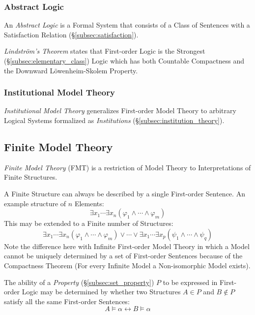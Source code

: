 \documentclass{article}
\begin{document}
\subsubsection{Abstract Logic}

An \emph{Abstract Logic} is a Formal System that consists of a Class
of Sentences with a Satisfaction Relation
(\S\ref{subsec:satisfaction}).

\emph{Lindstr\"om's Theorem} states that First-order Logic is the
Strongest (\S\ref{subsec:elementary_class}) Logic which has both
Countable Compactness and the Downward L\"owenheim-Skolem Property.

\subsubsection{Institutional Model Theory}

\emph{Institutional Model Theory} generalizes First-order Model Theory
to arbitrary Logical Systems formalized as \emph{Institutions}
(\S\ref{subsec:institution_theory}).

\subsection{Finite Model Theory}

\emph{Finite Model Theory} (FMT) is a restriction of Model Theory to
Interpretations of Finite Structures.

A Finite Structure can always be described by a single First-order
Sentence. An example structure of $n$ Elements:
\[
    \exists x_1 \cdots \exists x_n ( \varphi_1 \wedge \cdots \wedge
    \varphi_m )
\]
This may be extended to a Finite number of Structures:
\[
    \exists x_1 \cdots \exists x_n ( \varphi_1 \wedge \cdots \wedge
    \varphi_m )
    \vee
    \cdots
    \vee
    \exists x_1 \cdots \exists x_p ( \psi_1 \wedge \cdots \wedge
    \psi_q )
\]
Note the difference here with Infinite First-order Model Theory in
which a Model cannot be uniquely determined by a set of First-order
Sentences because of the Compactness Theorem (For every Infinite Model
a Non-isomorphic Model exists).

The ability of a \emph{Property} (\S\ref{subsec:set_property}) $P$ to
be expressed in First-order Logic may be determined by whether two
Structures $A \in P$ and $B \notin P$ satisfy all the same First-order
Sentences:
\[
    A \vDash \alpha \leftrightarrow B \vDash \alpha
\]
\end{document}
